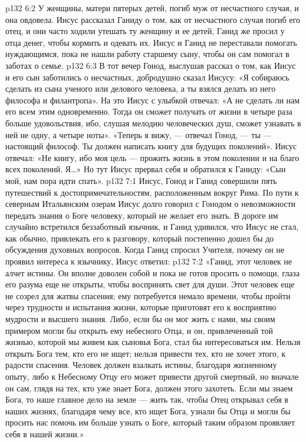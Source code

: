 \vs p132 6:2 \pc У женщины, матери пятерых детей, погиб муж от несчастного случая, и она овдовела. Иисус рассказал Ганиду о том, как от несчастного случая погиб его отец, и они часто ходили утешать ту женщину и ее детей, Ганид же просил у отца денег, чтобы кормить и одевать их. Иисус и Ганид не переставали помогать нуждающимся, пока не нашли работу старшему сыну, чтобы он сам помогал в заботах о семье.
\vs p132 6:3 \pc В тот вечер Гонод, выслушав рассказ о том, как Иисус и его сын заботились о несчастных, добродушно сказал Иисусу: «Я собираюсь сделать из сына ученого или делового человека, а ты взялся делать из него философа и филантропа». На это Иисус с улыбкой отвечал: «А не сделать ли нам его всем этим одновременно. Тогда он сможет получать от жизни в четыре раза больше удовольствия, ибо, слушая мелодию человеческих душ, сможет узнавать в ней не одну, а четыре ноты». «Теперь я вижу, --- отвечал Гонод, --- ты --- настоящий философ. Ты должен написать книгу для будущих поколений». Иисус отвечал: «Не книгу, ибо моя цель --- прожить жизнь в этом поколении и на благо всех поколений. Я\ldots » Но тут Иисус прервал себя и обратился к Ганиду: «Сын мой, нам пора идти спать».
\vs p132 7:1 Иисус, Гонод и Ганид совершили пять путешествий к достопримечательностям, расположенным вокруг Рима. По пути к северным Итальянским озерам Иисус долго говорил с Гонодом о невозможности передать знания о Боге человеку, который не желает его знать. В дороге им случайно встретился беззаботный язычник, и Ганид удивился, что Иисус не стал, как обычно, привлекать его к разговору, который постепенно дошел бы до обсуждения духовных вопросов. Когда Ганид спросил Учителя, почему он не проявил интереса к язычнику, Иисус ответил:
\vs p132 7:2 \pc «Ганид, этот человек не алчет истины. Он вполне доволен собой и пока не готов просить о помощи, глаза его разума еще не открыты, чтобы воспринять свет для души. Этот человек еще не созрел для жатвы спасения; ему потребуется немало времени, чтобы пройти через трудности и испытания жизни, которые приготовят его к восприятию мудрости и высшего знания. Либо, если бы он мог жить с нами, мы своим примером могли бы открыть ему небесного Отца, и он, привлеченный той жизнью, которой мы живем как сыновья Бога, стал бы интересоваться им. Нельзя открыть Бога тем, кто его не ищет; нельзя привести тех, кто не хочет этого, к радости спасения. Человек должен взалкать истины, благодаря жизненному опыту, либо к Небесному Отцу его может привести другой смертный, но вначале он сам, глядя на тех, кто уже знает Бога, должен этого захотеть. Если мы знаем Бога, то наше главное дело на земле --- жить так, чтобы Отец открывал себя в наших жизнях, благодаря чему все, кто ищет Бога, узнали бы Отца и могли бы просить нас помочь им больше узнать о Боге, который таким образом проявляет себя в нашей жизни.»
